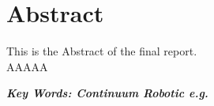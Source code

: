 \section*{Abstract} 
This is the Abstract of the final report. \\
AAAAA


\vfill


\textbf{\emph{Key Words: Continuum Robotic e.g.}}
\vspace{0.8cm}
\setcounter{page}{1}
\newpage